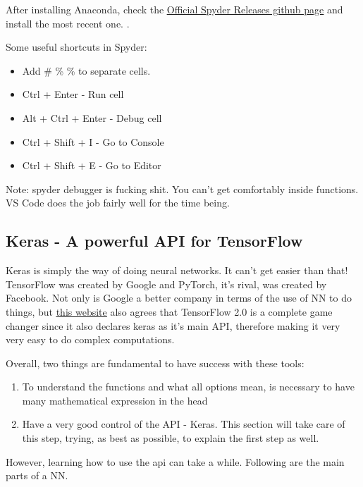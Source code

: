 After installing Anaconda, check the \href{https://github.com/spyder-ide/spyder/releases}{\ul{Official Spyder Releases github page}} and install the most recent one. .




Some useful shortcuts in Spyder:
\begin{itemize}
    \item Add \# \% \% to separate cells.
    \item Ctrl + Enter - Run cell
    \item Alt + Ctrl + Enter - Debug cell
    \item Ctrl + Shift + I - Go to Console
    \item Ctrl + Shift + E - Go to Editor
\end{itemize}

Note: spyder debugger is fucking shit. You can't get comfortably inside functions. VS Code does the job fairly well for the time being.


\subsection{Keras - A powerful API for TensorFlow}

Keras is simply the way of doing neural networks. It can't get easier than that!
TensorFlow was created by Google and PyTorch, it's rival, was created by Facebook. Not only is Google a better company in terms of the use of NN to do things, but 
\href{https://towardsdatascience.com/tensorflow-vs-pytorch-vs-keras-for-nlp-exxact-8e51dd13c3f5}{\ul{this website}} also agrees that TensorFlow 2.0 is a complete game changer since it also declares keras as it's main API, therefore making it very very easy to do complex computations.

Overall, two things are fundamental to have success with these tools: 
\begin{enumerate}
    \item To understand the functions and what all options mean, is necessary to have many mathematical expression in the head
    \item Have a very good control of the API - Keras. This section will take care of this step, trying, as best as possible, to explain the first step as well.
\end{enumerate}

However, learning how to use the api can take a while. Following are the main parts of a NN.

